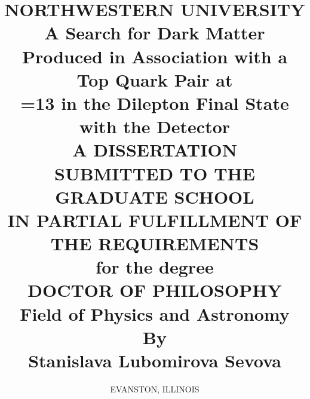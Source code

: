 \documentclass[hyperref,bindnopdf]{hepthesis}
\title{
  \normalsize
  \uppercase{Northwestern University} 
  \\
  \vspace{0.7 cm} 
  A Search for Dark Matter Produced in Association with a Top Quark Pair at\\ \sqrtS=\unit{13}{\TeV} in the Dilepton Final State with the \CMS Detector
  \\ 
  \vspace{0.7 cm}
  \uppercase{A Dissertation} \\
  \vspace{0.7 cm}
  \uppercase{Submitted to the graduate school \\ in partial fulfillment of the requirements} \\
  \vspace{0.7 cm}
  \small{for the degree} \\
  \vspace{0.7 cm}
  \uppercase{Doctor of Philosophy} \\
  \vspace{0.7 cm}
  Field of Physics and Astronomy \\
  \vspace{1.0 cm}
  By\\
  \vspace{0.3cm}
  Stanislava Lubomirova Sevova
}
\author{\normalsize \uppercase{Evanston, Illinois}}%
\begin{document}
\begin{frontmatter}
  
\end{frontmatter}

\begin{mainmatter}
  
  
  
  
  
  
  
  
\end{mainmatter}

\begin{appendices}
  
\end{appendices}

\begin{backmatter}
  
\end{backmatter}

\end{document}
